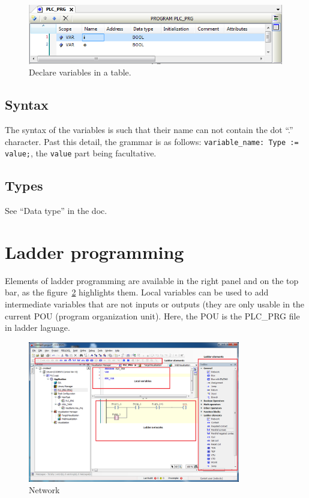 \documentclass[10pt,a4paper]{article}
\begin{document}
\begin{figure}[h!]
	\center
	\includegraphics[width=.8\textwidth]{var-tab}
	\caption{Declare variables in a table.}
	\label{fig:var-tab}
\end{figure}

\subsection{Syntax}
The syntax of the variables is such that their name can not contain the dot ``.'' character.
Past this detail, the grammar is as follows: \texttt{variable\_name: Type := value;}, the \texttt{value} part being facultative.

\subsection{Types}
See ``Data type'' in the doc.




\section{Ladder programming}

Elements of ladder programming are available in the right panel and on the top bar, as the figure~\ref{fig:network} highlights them.
Local variables can be used to add intermediate variables that are not inputs or outputs (they are only usable in the current POU (program organization unit). Here, the POU is the PLC\_PRG file in ladder laguage.

\begin{figure}[h!]
	\begin{center}
		\includegraphics[width=350px]{img7.PNG}
	\end{center}
\caption{Network}
\label{fig:network}
\end{figure}
\end{document}
